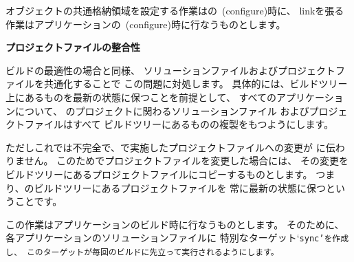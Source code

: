 \begin{narrow}[20pt]
	\medskip
	オブジェクトの共通格納領域を設定する作業は\SprLib の\cmake\ (configure)時に、
	linkを張る作業はアプリケーションの\cmake\ (configure)時に行なうものとします。
\end{narrow}

\medskip
\bf{プロジェクトファイルの整合性}
\begin{narrow}[20pt]
	ビルドの最適性の場合と同様、
	ソリューションファイルおよびプロジェクトファイルを共通化することで
	この問題に対処します。
	具体的には、\SprLib ビルドツリー上にあるものを最新の状態に保つことを前提として、
	すべてのアプリケーションについて、
	\SprLib のプロジェクトに関わるソリューションファイル
	およびプロジェクトファイルはすべて
	\SprLib ビルドツリーにあるものの複製をもつようにします。

	\medskip
	ただしこれでは不完全で、で実施したプロジェクトファイルへの変更が
	に伝わりません。
	このためでプロジェクトファイルを変更した場合には、
	その変更を\SprLib ビルドツリーにあるプロジェクトファイルにコピーするものとします。
	つまり、\SprLib のビルドツリーにあるプロジェクトファイルを
	常に最新の状態に保つということです。

	\medskip
	この作業はアプリケーションのビルド時に行なうものとします。
	そのために、各アプリケーションのソリューションファイルに
	特別なターゲット`\tt{sync}'を作成し、
	このターゲットが毎回のビルドに先立って実行されるようにします。


\end{narrow}
